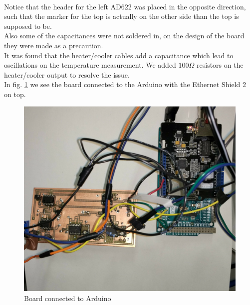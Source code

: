 \documentclass[12pt]{scrartcl}
\begin{document}
      \\ Notice that the header for the left AD622 was placed in the opposite
      direction, such that the marker for the top is actually on the other side
      than the top is supposed to be.\\
      Also some of the capacitances were not soldered in, on the design of the
      board they were made as a precaution.\\
      It was found that the heater/cooler cables add a capacitance which lead
      to oscillations on the temperature measurement. We added $100 \Omega$
      resistors on the heater/cooler output to resolve the issue.\\ In fig.
      \ref{fig6} we see the board connected to the Arduino with the Ethernet
      Shield 2 on top.\\
      \begin{figure}[h]
        \includegraphics[width = \textwidth]{boardwitharduino.jpg}
        \caption{Board connected to Arduino}
        \label{fig6}
      \end{figure}
\end{document}
